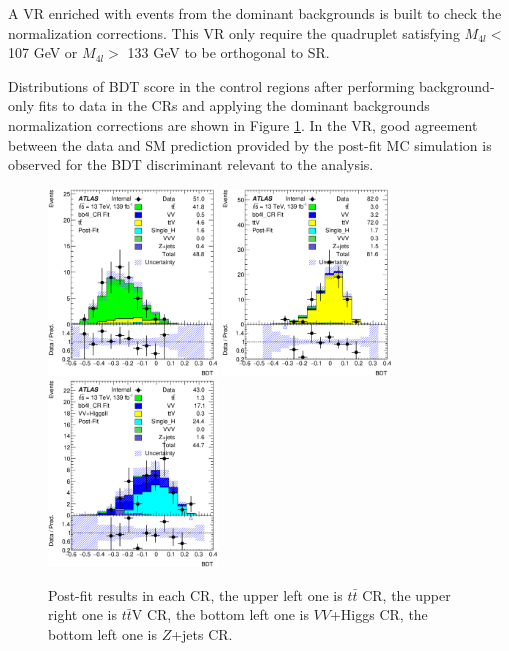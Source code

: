 A VR enriched with events from the dominant backgrounds is built to check the normalization corrections. This VR only require the quadruplet satisfying $M_{ 4l}<$ 107 GeV or $M_{ 4l}>$ 133 GeV to be orthogonal to SR.

Distributions of BDT score in the control regions after performing background-only fits to data in the CRs and applying the dominant backgrounds normalization corrections are shown in Figure \ref{Fig.CRs post-fit}. In the VR, good agreement between the data and SM prediction provided by the post-fit MC simulation is observed for the BDT discriminant relevant to the analysis.

\begin{figure}[h!]
	\caption{Post-fit results in each CR, the upper left one is $t\bar{t}$ CR, the upper right one is $t\bar{t}$V CR, the bottom left one is $VV$+Higgs CR, the bottom left one is $Z$+jets CR.}
	\label{Fig.CRs post-fit}
	\centering
	\includegraphics[width=0.4\textwidth]{figures/4lbb/Plots/tt_CR_postFit.eps}
	\includegraphics[width=0.4\textwidth]{figures/4lbb/Plots/ttV_CR_postFit.eps}
	\includegraphics[width=0.4\textwidth]{figures/4lbb/Plots/VVHiggsII_CR_postFit.eps}

\end{figure}
